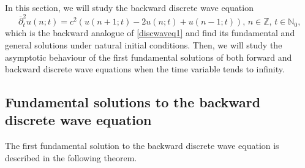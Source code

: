 \documentclass[12pt]{amsart}
\numberwithin{equation}{section}
\begin{document}
In this section, we will study the backward discrete wave equation
\begin{equation}
\overline{\partial }_{t}^{2}u\left( n;t\right) =c^{2}\left( u\left(
n+1;t\right) -2u\left( n;t\right) +u\left( n-1;t\right) \right) \text{, \ }%
n\in \mathbb{Z}\text{, \ }t\in \mathbb{N}_{0}\text{,}  \label{backWaveEq}
\end{equation}
which is the backward analogue of \eqref{discwaveq1} and find its fundamental and general solutions under natural initial conditions.
Then, we will study the asymptotic behaviour of the first fundamental solutions of both
forward and backward discrete wave equations when the time variable tends to infinity.

\setcounter{subsection}{0}
\subsection{Fundamental solutions to the backward discrete wave equation}

The first fundamental solution to the backward discrete wave equation is described in the following theorem.
\end{document}
